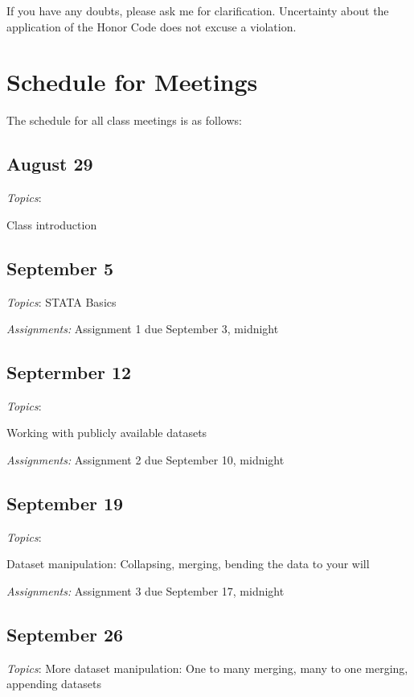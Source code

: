 \documentclass[12pt]{article}
\begin{document}
If you have any doubts, please ask me for clarification. Uncertainty
about the application of the Honor Code does not excuse a violation.

\section{Schedule for Meetings}

The schedule for all class meetings is as follows:

\begin{flushleft}

\subsection{August 29}

\textit{Topics}:

Class introduction

\subsection{September 5}


\textit{Topics}:
STATA Basics

\textit {Assignments:}
Assignment 1 due September 3, midnight

\subsection{Septermber 12}

\textit{Topics}:

Working with publicly available datasets

\textit {Assignments:}
Assignment 2 due September 10, midnight

\subsection{September 19}


\textit{Topics}:

Dataset manipulation: Collapsing, merging, bending the data to your will


\textit {Assignments:}
Assignment 3 due September 17, midnight
\subsection{September 26}


\textit{Topics}:
More dataset manipulation: One to many merging, many to one merging, appending datasets


\end{flushleft}
\end{document}
